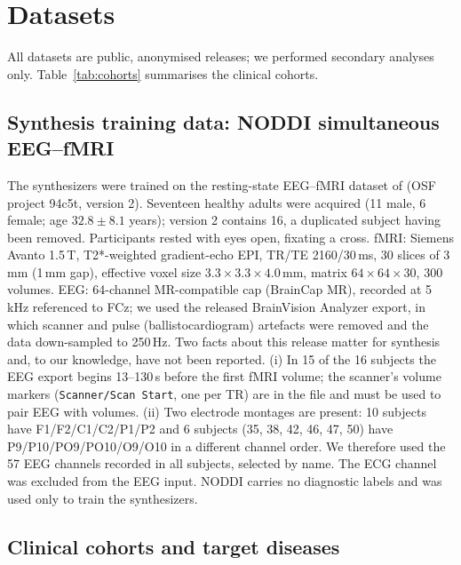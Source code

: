 \documentclass[11pt]{article}
\begin{document}
\section{Datasets}\label{sec:data}

All datasets are public, anonymised releases; we performed secondary analyses only.
Table~\ref{tab:cohorts} summarises the clinical cohorts.

\subsection{Synthesis training data: NODDI simultaneous EEG--fMRI}\label{sec:noddi}
The synthesizers were trained on the resting-state EEG--fMRI dataset of \citet{deligianni2014,deligianni2016} (OSF project 94c5t, version 2).
Seventeen healthy adults were acquired (11 male, 6 female; age $32.8\pm8.1$ years); version 2 contains 16, a duplicated subject having been removed.
Participants rested with eyes open, fixating a cross.
fMRI: Siemens Avanto 1.5\,T, T2*-weighted gradient-echo EPI, TR/TE 2160/30\,ms, 30 slices of 3\,mm (1\,mm gap), effective voxel size $3.3\times3.3\times4.0$\,mm, matrix $64\times64\times30$, 300 volumes.
EEG: 64-channel MR-compatible cap (BrainCap MR), recorded at 5\,kHz referenced to FCz; we used the released BrainVision Analyzer export, in which scanner and pulse (ballistocardiogram) artefacts were removed and the data down-sampled to 250\,Hz.
Two facts about this release matter for synthesis and, to our knowledge, have not been reported.
(i) In 15 of the 16 subjects the EEG export begins 13--130\,s before the first fMRI volume; the scanner's volume markers (\texttt{Scanner/Scan Start}, one per TR) are in the file and must be used to pair EEG with volumes.
(ii) Two electrode montages are present: 10 subjects have F1/F2/C1/C2/P1/P2 and 6 subjects (35, 38, 42, 46, 47, 50) have P9/P10/PO9/PO10/O9/O10 in a different channel order. We therefore used the 57 EEG channels recorded in all subjects, selected by name.
The ECG channel was excluded from the EEG input.
NODDI carries no diagnostic labels and was used only to train the synthesizers.

\subsection{Clinical cohorts and target diseases}\label{sec:cohorts}
\end{document}
